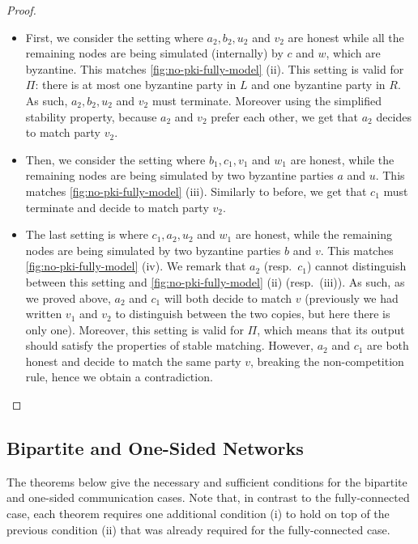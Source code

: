 \begin{proof}
\begin{itemize}[nosep,leftmargin=*]    
    \item First, we consider the setting where $a_2, b_2, u_2$ and $v_2$ are honest while all the remaining nodes are being simulated (internally) by $c$ and $w$, which are byzantine. This matches \cref{fig:no-pki-fully-model} (ii). This setting is valid for $\Pi$: there is at most one byzantine party in $L$ and one byzantine party in $R$. As such, $a_2, b_2, u_2$ and $v_2$ must terminate. Moreover using the simplified stability property, because $a_2$ and $v_2$ prefer each other, we get that $a_2$ decides to match party $v_2$. 

    \item Then, we consider the setting where $b_1, c_1, v_1$ and $w_1$ are honest, while the remaining nodes are being simulated by two byzantine parties $a$ and $u$. This matches \cref{fig:no-pki-fully-model} (iii). Similarly to before, we get that $c_1$ must terminate and decide to match party $v_2$.

    \item The last setting is where $c_1, a_2, u_2$ and $w_1$ are honest, while the remaining nodes are being simulated by two byzantine parties $b$ and $v$. This matches \cref{fig:no-pki-fully-model} (iv). We remark that $a_2$ (resp.~$c_1$) cannot distinguish between this setting and \cref{fig:no-pki-fully-model} (ii) (resp.~(iii)). As such, as we proved above, $a_2$ and $c_1$ will both decide to match $v$ (previously we had written $v_1$ and $v_2$ to distinguish between the two copies, but here there is only one). Moreover, this setting is valid for $\Pi$, which means that its output should satisfy the properties of stable matching. However, $a_2$ and $c_1$ are both honest and decide to match the same party $v$, breaking the non-competition rule, hence we obtain a contradiction. \qedhere
\end{itemize}
\end{proof}


\subsection{Bipartite and One-Sided Networks}

The theorems below give the necessary and sufficient conditions for the bipartite and one-sided communication cases. Note that, in contrast to the fully-connected case, each theorem requires one additional condition (i) to hold on top of the previous condition (ii) that was already required for the fully-connected case.

